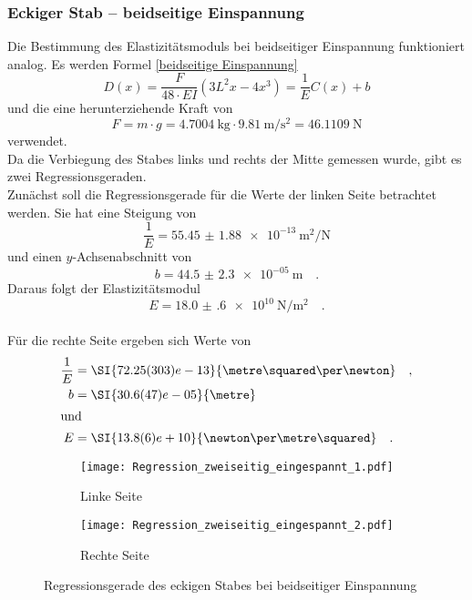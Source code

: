 \subsubsection{Eckiger Stab -- beidseitige Einspannung}
Die Bestimmung des Elastizitätsmoduls bei beidseitiger Einspannung funktioniert analog. Es werden Formel \eqref{beidseitige Einspannung}
\begin{equation*}
	D(x) = \frac{F}{48\cdot E I}\left(3L^2x-4x^3\right) = \frac{1}{E}C(x)+b
\end{equation*}
und die eine herunterziehende Kraft von
\begin{equation}
  F = m \cdot g = \SI{4.7004}{\kilo\gram} \cdot \SI{9.81}{\metre\per\second\squared} = \SI{46.1109}{\newton}
\end{equation}
verwendet. \\
Da die Verbiegung des Stabes links und rechts der Mitte gemessen wurde, gibt es zwei Regressionsgeraden. \\
Zunächst soll die Regressionsgerade für die Werte der linken Seite betrachtet werden. Sie hat eine Steigung von
\begin{equation}
  \frac{1}{E}= \SI{55.45(188)e-13}{\metre\squared\per\newton}
\end{equation}
und einen $y$-Achsenabschnitt von
\begin{equation}
  b = \SI{44.5(23)e-05}{\metre} \quad.
\end{equation}
Daraus folgt der Elastizitätsmodul
\begin{equation}
  E = \SI{18.0(6)e+10}{\newton\per\metre\squared} \quad.
\end{equation}
\\
Für die rechte Seite ergeben sich Werte von
\begin{align}
  \frac{1}{E} &= \SI{72.25(303)e-13}{\metre\squared\per\newton} \quad,\\
  b &= \SI{30.6(47)e-05}{\metre} \\
  \intertext{und}
  E &= \SI{13.8(6)e+10}{\newton\per\metre\squared} \quad.
\end{align}

\begin{figure}
\centering
\begin{subfigure}{0.49\textwidth}
\centering
\texttt{[image: Regression\_zweiseitig\_eingespannt\_1.pdf]}
\caption{Linke Seite}
\end{subfigure}
\begin{subfigure}{0.49\textwidth}
\centering
\texttt{[image: Regression\_zweiseitig\_eingespannt\_2.pdf]}
\caption{Rechte Seite}
\end{subfigure}
\caption{Regressionsgerade des eckigen Stabes bei beidseitiger Einspannung}
\end{figure}


